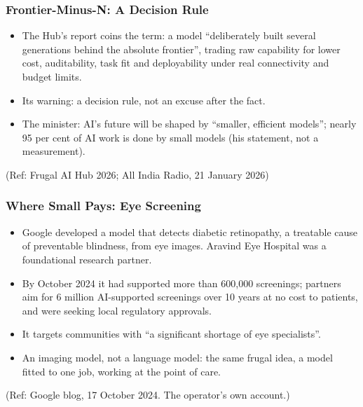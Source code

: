 \begin{frame}[fragile]\frametitle{Frontier-Minus-N: A Decision Rule}
\begin{itemize}
\item The Hub's report coins the term: a model ``deliberately built several generations behind the absolute frontier'', trading raw capability for lower cost, auditability, task fit and deployability under real connectivity and budget limits.
\item Its warning: a decision rule, not an excuse after the fact.
\item The minister: AI's future will be shaped by ``smaller, efficient models''; nearly 95 per cent of AI work is done by small models (his statement, not a measurement).
\end{itemize}
{\tiny (Ref: Frugal AI Hub 2026; All India Radio, 21 January 2026)}
\end{frame}

\begin{frame}[fragile]\frametitle{Where Small Pays: Eye Screening}
\begin{itemize}
\item Google developed a model that detects diabetic retinopathy, a treatable cause of preventable blindness, from eye images. Aravind Eye Hospital was a foundational research partner.
\item By October 2024 it had supported more than 600,000 screenings; partners aim for 6 million AI-supported screenings over 10 years at no cost to patients, and were seeking local regulatory approvals.
\item It targets communities with ``a significant shortage of eye specialists''.
\item An imaging model, not a language model: the same frugal idea, a model fitted to one job, working at the point of care.
\end{itemize}
{\tiny (Ref: Google blog, 17 October 2024. The operator's own account.)}
\end{frame}

